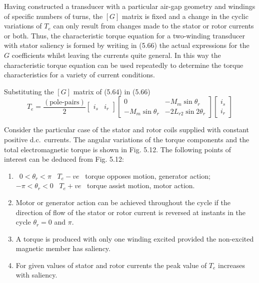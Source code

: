 \documentclass[a4paper,numbers=noenddot,12pt]{scrbook}
\begin{document}
    Having constructed a transducer with a particular air-gap geometry and windings of specific numbers of turns, the $[G]$ matrix is fixed and a change in the cyclic variations of $T_e$ can only result from changes made to the stator or rotor currents or both. Thus, the characteristic torque equation for a two-winding transducer with stator saliency is formed by writing in (5.66) the actual expressions for the $G$ coefficients whilst leaving the currents quite general. In this way the characteristic torque equation can be used repeatedly to determine the torque characteristics for a variety of current conditions.

    Substituting the $[G]$ matrix of (5.64) in (5.66)
    \begin{equation}
        T_e = \frac{(\text{pole-pairs})}{2}
        \begin{bmatrix}
            i_s & i_r
        \end{bmatrix}
        \begin{bmatrix}
            0 & -M_m\sin\theta_r \\ 
            - M_m \sin \theta_r & -2 L_{r2} \sin 2 \theta_r
        \end{bmatrix}
        \begin{bmatrix}
            i_s \\ i_r
        \end{bmatrix}
    \end{equation}

    Consider the particular case of the stator and rotor coils supplied with constant positive d.c.\ currents. The angular variations of the torque components and the total electromagnetic torque is shown in Fig. 5.12.
    \TabPositions{2.5cm,4cm}
    The following points of interest can be deduced from Fig. 5.12:
    \begin{enumerate}[label={(\alph*)}]
        \item\ $ 0 < \theta_r < \pi $ \tab\ $T_e - v e$ \tab\ torque opposes motion, generator action;\\
            $-\pi < \theta_r < 0 $ \tab\ $T_e + v e$ \tab\ torque assist motion, motor action.

        \item Motor or generator action can be achieved throughout the cycle if the direction of flow of the stator or rotor current is reversed at instants in the cycle $\theta_r = 0$ and $\pi$.

        \item A torque is produced with only one winding excited provided the non-excited magnetic member has saliency.

        \item For given values of stator and rotor currents the peak value of $T_e$ increases with saliency.
    \end{enumerate}
\end{document}
